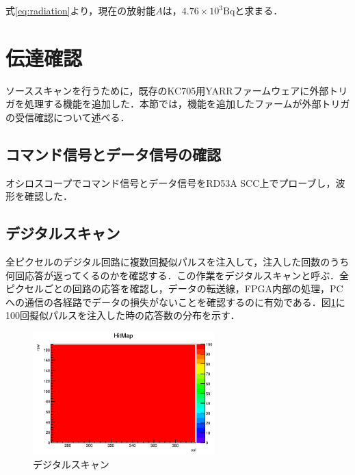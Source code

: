 式\ref{eq:radiation}より，現在の放射能$A$は，$4.76 \times 10^3 \mathrm{Bq}$と求まる．
  




\section{伝達確認}
\label{sec:scans}
ソーススキャンを行うために，既存のKC705用YARRファームウェアに外部トリガを処理する機能を追加した．本節では，機能を追加したファームが外部トリガの受信確認について述べる．

\subsection{コマンド信号とデータ信号の確認}
オシロスコープでコマンド信号とデータ信号をRD53A SCC上でプローブし，波形を確認した．

\subsection{デジタルスキャン}
全ピクセルのデジタル回路に複数回擬似パルスを注入して，注入した回数のうち何回応答が返ってくるのかを確認する．この作業をデジタルスキャンと呼ぶ．全ピクセルごとの回路の応答を確認し，データの転送線，FPGA内部の処理，PCへの通信の各経路でデータの損失がないことを確認するのに有効である．図\ref{fig:digital}に100回擬似パルスを注入した時の応答数の分布を示す．
\begin{figure}[h]
  \centering
  \includegraphics[width=7cm]{./figure/DigitalScan.png}
  \caption{デジタルスキャン}
  \label{fig:digital}
\end{figure}


